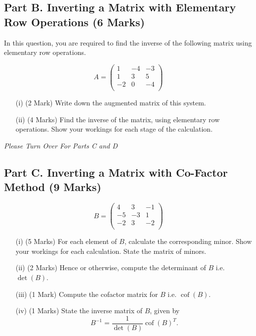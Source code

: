 \documentclass[a4paper,12pt]{article}
\begin{document}
	\subsection*{Part B. Inverting a Matrix with Elementary Row Operations  (6 Marks)}	
In this question, you are required to find the inverse of the following matrix using elementary row operations.
	
	\begin{equation*}
	A=\left( \begin{array}{rrr}
  1 &  -4   & -3 \\
  1 &   3   & 5 \\
  -2 &   0   & -4 \\
	\end{array} \right)
	\end{equation*}
	
	
			\begin{itemize}
				\item[(i)] (2 Mark) Write down the augmented matrix of this system. %
				
				
				\item[(ii)] (4 Marks) Find the inverse of the matrix, using elementary row operations. Show your workings for each stage of the calculation.
			\end{itemize}
			\medskip
		\noindent 	\textit{Please Turn Over For Parts C and D}
\newpage
	\subsection*{Part C. Inverting a Matrix with Co-Factor Method (9 Marks)}		
		\begin{equation*}
		B=\left( \begin{array}{rrr}
4  &  3 &  -1 \\
-5 &  -3  &  1 \\
-2 &   3 &  -2 \\
		\end{array} \right)
		\end{equation*}
	\begin{itemize}
		\item[(i)] (5 Marks) For each element of $B$, calculate the corresponding minor. Show your workings for each calculation. 
		State the matrix of minors.
		\item[(ii)] (2 Marks) Hence or otherwise, compute the determinant of $B$ i.e. $\det(B)$.
		\item[(iii)] (1 Mark) Compute the cofactor matrix for $B$ i.e. $\operatorname{cof}(B)$.
		\item[(iv)] (1 Marks) State the inverse matrix of $B$, given by
		\[ B^{-1}=\frac{1}{\det(B)}  \operatorname{cof}(B)^T. \]
	\end{itemize}
\end{document}
